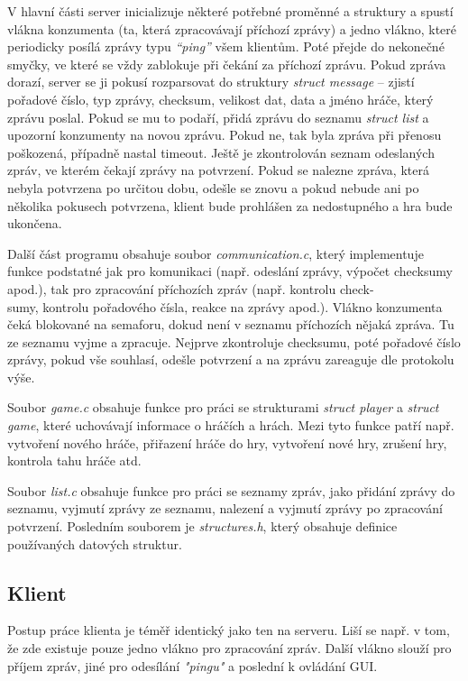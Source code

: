 \documentclass[12pt, a4paper]{article}
\begin{document}
		V hlavní části server inicializuje některé potřebné proměnné a struktury a spustí vlákna konzumenta (ta, která zpracovávají příchozí zprávy) a jedno vlákno, které periodicky posílá zprávy typu \emph{“ping”} všem klientům. Poté přejde do nekonečné smyčky, ve které se vždy zablokuje při čekání za příchozí zprávu. Pokud zpráva dorazí, server se ji pokusí rozparsovat do struktury \emph{struct message} -- zjistí pořadové číslo, typ zprávy, checksum, velikost dat, data a jméno hráče, který zprávu poslal. Pokud se mu to podaří, přidá zprávu do seznamu \emph{struct list} a upozorní konzumenty na novou zprávu. Pokud ne, tak byla zpráva při přenosu poškozená, případně nastal timeout. Ještě je zkontrolován seznam odeslaných zpráv, ve kterém čekají zprávy na potvrzení. Pokud se nalezne zpráva, která nebyla potvrzena po určitou dobu, odešle se znovu a pokud nebude ani po několika pokusech potvrzena, klient bude prohlášen za nedostupného a hra bude ukončena.
		
		Další část programu obsahuje soubor \emph{communication.c}, který implementuje funkce podstatné jak pro komunikaci (např. odeslání zprávy, výpočet checksumy apod.), tak pro zpracování příchozích zpráv (např. kontrolu check-\\sumy, kontrolu pořadového čísla, reakce na zprávy apod.). Vlákno konzumenta čeká blokované na semaforu, dokud není v seznamu příchozích nějaká zpráva. Tu ze seznamu vyjme a zpracuje. Nejprve zkontroluje checksumu, poté pořadové číslo zprávy, pokud vše souhlasí, odešle potvrzení a na zprávu zareaguje dle protokolu výše.
		
		Soubor \emph{game.c} obsahuje funkce pro práci se strukturami \emph{struct player} a \emph{struct game}, které uchovávají informace o hráčích a hrách. Mezi tyto funkce patří např. vytvoření nového hráče, přiřazení hráče do hry, vytvoření nové hry, zrušení hry, kontrola tahu hráče atd.
		
		Soubor \emph{list.c} obsahuje funkce pro práci se seznamy zpráv, jako přidání zprávy do seznamu, vyjmutí zprávy ze seznamu, nalezení a vyjmutí zprávy po zpracování potvrzení. Posledním souborem je \emph{structures.h}, který obsahuje definice používaných datových struktur.
		
		\subsection{Klient}
		Postup práce klienta je téměř identický jako ten na serveru. Liší se např. v tom, že zde existuje pouze jedno vlákno pro zpracování zpráv. Další vlákno slouží pro příjem zpráv, jiné pro odesílání \emph{"pingu"} a poslední k ovládání GUI.
		
\end{document}

